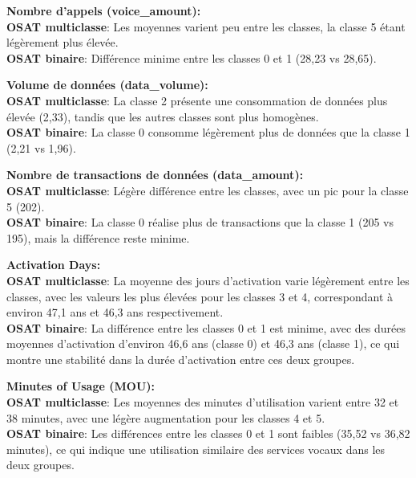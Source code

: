 \noindent \textbf{Nombre d'appels (voice\_amount):} \\
\textbf{OSAT multiclasse}: Les moyennes varient peu entre les classes, la classe 5 étant légèrement plus élevée. \\
\textbf{OSAT binaire}: Différence minime entre les classes 0 et 1 (28,23 vs 28,65).

\vspace{0.2cm}

\noindent \textbf{Volume de données (data\_volume):} \\
\textbf{OSAT multiclasse}: La classe 2 présente une consommation de données plus élevée (2,33), tandis que les autres classes sont plus homogènes. \\
\textbf{OSAT binaire}: La classe 0 consomme légèrement plus de données que la classe 1 (2,21 vs 1,96).

\vspace{0.2cm}

\noindent \textbf{Nombre de transactions de données (data\_amount):} \\
\textbf{OSAT multiclasse}: Légère différence entre les classes, avec un pic pour la classe 5 (202). \\
\textbf{OSAT binaire}: La classe 0 réalise plus de transactions que la classe 1 (205 vs 195), mais la différence reste minime.

\vspace{0.2cm}

\noindent \textbf{Activation Days:} \\
\textbf{OSAT multiclasse}: La moyenne des jours d'activation varie légèrement entre les classes, avec les valeurs les plus élevées pour les classes 3 et 4, correspondant à environ 47,1 ans et 46,3 ans respectivement. \\
\textbf{OSAT binaire}: La différence entre les classes 0 et 1 est minime, avec des durées moyennes d'activation d'environ 46,6 ans (classe 0) et 46,3 ans (classe 1), ce qui montre une stabilité dans la durée d'activation entre ces deux groupes.

\vspace{0.2cm}

\noindent \textbf{Minutes of Usage (MOU):} \\
\textbf{OSAT multiclasse}: Les moyennes des minutes d'utilisation varient entre 32 et 38 minutes, avec une légère augmentation pour les classes 4 et 5. \\
\textbf{OSAT binaire}: Les différences entre les classes 0 et 1 sont faibles (35,52 vs 36,82 minutes), ce qui indique une utilisation similaire des services vocaux dans les deux groupes.

